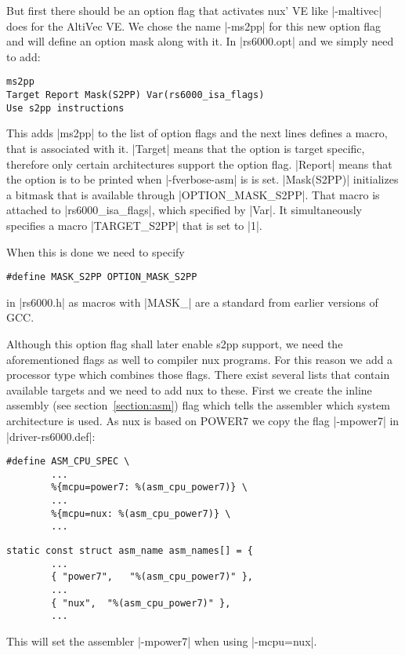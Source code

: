 But first there should be an option flag that activates nux' VE like |-maltivec| does for the AltiVec VE.
We chose the name |-ms2pp| for this new option flag and will define an option mask along with it.
In |rs6000.opt| and we simply need to add:
\begin{lstlisting}
ms2pp
Target Report Mask(S2PP) Var(rs6000_isa_flags)
Use s2pp instructions
\end{lstlisting}
This adds |ms2pp| to the list of option flags and the next lines defines a macro, that is associated with it.
|Target| means that the option is target specific, therefore only certain architectures support the option flag.
|Report| means that the option is to be printed when |-fverbose-asm| is is set.
|Mask(S2PP)| initializes a bitmask that is available through |OPTION_MASK_S2PP|.
That macro is attached to |rs6000_isa_flags|, which specified by |Var|.
It simultaneously specifies a macro |TARGET_S2PP| that is set to |1|. \citep[ch.~8]{GCCint}

When this is done we need to specify 
\begin{lstlisting}
#define MASK_S2PP OPTION_MASK_S2PP
\end{lstlisting}
in |rs6000.h| as macros with |MASK_| are a standard from earlier versions of GCC.

Although this option flag shall later enable s2pp support, we need the aforementioned flags as well to compiler nux programs.
For this reason we add a processor type which combines those flags.
There exist several lists that contain available targets and we need to add nux to these.
First we create the inline assembly (see section~\ref{section:asm}) flag which tells the assembler which system architecture is used.
As nux is based on POWER7 we copy the flag |-mpower7| in |driver-rs6000.def|:

    \begin{lstlisting}[caption=\tt rs6000.h]
    #define ASM_CPU_SPEC \
        ...
        %{mcpu=power7: %(asm_cpu_power7)} \
        ...
        %{mcpu=nux: %(asm_cpu_power7)} \
        ...
    \end{lstlisting}
    \begin{lstlisting}[caption=\tt driver-rs6000.c]
    static const struct asm_name asm_names[] = {
        ...
        { "power7",   "%(asm_cpu_power7)" },
        ...
        { "nux",  "%(asm_cpu_power7)" },
        ...
    \end{lstlisting}

This will set the assembler |-mpower7| when using |-mcpu=nux|.

